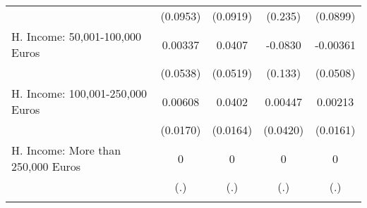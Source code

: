 {\begin{tabular}{l*{4}{c}}
            &    (0.0953)         &    (0.0919)         &     (0.235)         &    (0.0899)         \\
[1em]
H. Income: 50,001-100,000 Euros&     0.00337         &      0.0407         &     -0.0830         &    -0.00361         \\
            &    (0.0538)         &    (0.0519)         &     (0.133)         &    (0.0508)         \\
[1em]
H. Income: 100,001-250,000 Euros&     0.00608         &      0.0402\sym{*}  &     0.00447         &     0.00213         \\
            &    (0.0170)         &    (0.0164)         &    (0.0420)         &    (0.0161)         \\
[1em]
H. Income: More than 250,000 Euros&           0         &           0         &           0         &           0         \\
            &         (.)         &         (.)         &         (.)         &         (.)         \\
\hline\hline
{}\\
\end{tabular}
}
